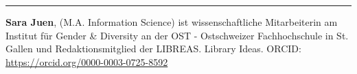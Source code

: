 \begin{center}\rule{0.5\linewidth}{0.5pt}\end{center}

\textbf{Sara Juen}, (M.A. Information Science) ist wissenschaftliche
Mitarbeiterin am Institut für Gender \& Diversity an der OST -
Ostschweizer Fachhochschule in St. Gallen und Redaktionsmitglied der
LIBREAS. Library Ideas. ORCID: \url{https://orcid.org/0000-0003-0725-8592}
